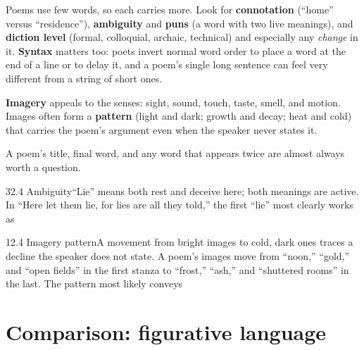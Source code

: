 \documentclass[11pt]{article}
\begin{document}
Poems use few words, so each carries more. Look for \textbf{connotation} (``home'' versus ``residence''), \textbf{ambiguity} and \textbf{puns} (a word with two live meanings), and \textbf{diction level} (formal, colloquial, archaic, technical) and especially any \emph{change} in it. \textbf{Syntax} matters too: poets invert normal word order to place a word at the end of a line or to delay it, and a poem's single long sentence can feel very different from a string of short ones.

\textbf{Imagery} appeals to the senses: sight, sound, touch, taste, smell, and motion. Images often form a \textbf{pattern} (light and dark; growth and decay; heat and cold) that carries the poem's argument even when the speaker never states it.

\begin{trap}
A poem's title, final word, and any word that appears twice are almost always worth a question.
\end{trap}

\begin{q}{3}{2.4 Ambiguity}{``Lie'' means both rest and deceive here; both meanings are active.}
In ``Here let them lie, for lies are all they told,'' the first ``lie'' most clearly works as
\end{q}

\begin{q}{1}{2.4 Imagery pattern}{A movement from bright images to cold, dark ones traces a decline the speaker does not state.}
A poem's images move from ``noon,'' ``gold,'' and ``open fields'' in the first stanza to ``frost,'' ``ash,'' and ``shuttered rooms'' in the last. The pattern most likely conveys
\end{q}

\section{Comparison: figurative language}
\label{sec:5}
\end{document}
